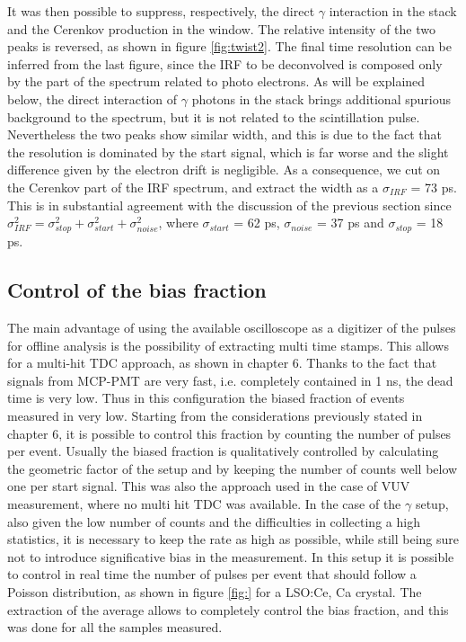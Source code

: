 It was then possible to suppress, respectively, the direct $\gamma$ interaction in the stack and the Cerenkov production in the window. The relative intensity of the two peaks is reversed, as shown in figure \ref{fig:twist2}. 
The final time resolution can be inferred from the 
last figure, since the IRF to be deconvolved is composed only by the part of the spectrum related to photo electrons. As will be explained below, the direct interaction of $\gamma$ photons in the stack brings additional spurious background to the spectrum, but it is not related to the scintillation pulse. Nevertheless the two peaks show similar width, and this is due to the fact that the resolution is dominated by the start signal, which is far worse and the slight difference given by the electron drift is negligible.
As a consequence, we cut on the Cerenkov part of the IRF spectrum, and extract the width as a $\sigma _{IRF}$ = 73 ps. This is in substantial agreement with the discussion of the previous section since $\sigma _{IRF}^{2} = \sigma _{stop}^{2} + \sigma _{start}^{2} + \sigma _{noise}^{2}$, where $\sigma _{start}$ = 62 ps, $\sigma _{noise}$ = 37 ps and $\sigma _{stop}$ = 18 ps.

\subsection{Control of the bias fraction}
The main advantage of using the available oscilloscope as a digitizer of the pulses for offline analysis is the possibility of extracting multi time stamps. This allows for a multi-hit TDC approach, as shown in chapter 6. 
Thanks to the fact that signals from MCP-PMT are very fast, i.e. completely contained in 1 ns, the dead time is very low. Thus in this configuration the biased fraction of events measured in very low. 
Starting from the considerations previously stated in chapter 6, it is possible to control this fraction by counting the number of pulses per event.
Usually the biased fraction is qualitatively controlled by calculating the geometric factor of the setup and by keeping the number of counts well below one per start signal. This was also the approach used in the case of VUV measurement, where  no multi hit TDC was available.
In the case of the $\gamma$ setup, also given the low number of counts and the difficulties in collecting a high statistics, it is necessary to keep the rate as high as possible, while still being sure not to introduce significative bias in the measurement.
In this setup it is possible to control in real time the number of pulses per event that should follow a Poisson distribution, as shown in figure \ref{fig:} for a LSO:Ce, Ca crystal. The extraction of the average allows to completely control the bias fraction, and this was done for all the samples measured.

